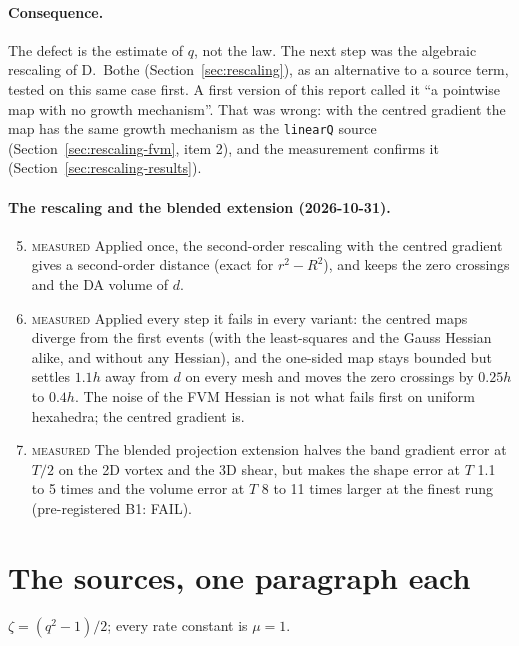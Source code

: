 \documentclass[11pt,a4paper]{article}
\newcommand{\Meas}{\textsc{measured}}
\begin{document}
\paragraph{Consequence.} The defect is the estimate of $q$, not the law. The next step was the
algebraic rescaling of D.~Bothe (Section~\ref{sec:rescaling}), as an alternative to a source
term, tested on this same case first. A first version of this report called it ``a pointwise map
with no growth mechanism''. That was wrong: with the centred gradient the map has the same growth
mechanism as the \texttt{linearQ} source (Section~\ref{sec:rescaling-fvm}, item 2), and the
measurement confirms it (Section~\ref{sec:rescaling-results}).

\paragraph{The rescaling and the blended extension (2026-10-31).}
\begin{enumerate}\setcounter{enumi}{4}
\item \Meas{} Applied once, the second-order rescaling with the centred gradient gives a
second-order distance (exact for $r^2-R^2$), and keeps the zero crossings and the DA volume of $d$.
\item \Meas{} Applied every step it fails in every variant: the centred maps diverge from the
first events (with the least-squares and the Gauss Hessian alike, and without any Hessian), and
the one-sided map stays bounded but settles $1.1h$ away from $d$ on every mesh and moves the
zero crossings by $0.25h$ to $0.4h$. The noise of the FVM Hessian is not what fails first on
uniform hexahedra; the centred gradient is.
\item \Meas{} The blended projection extension halves the band gradient error at $T/2$ on the
2D vortex and the 3D shear, but makes the shape error at $T$ 1.1 to 5 times and the volume error
at $T$ 8 to 11 times larger at the finest rung (pre-registered B1: FAIL).
\end{enumerate}

\section{The sources, one paragraph each}
\label{sec:each}

$\zeta=(q^2-1)/2$; every rate constant is $\mu=1$.
\end{document}
